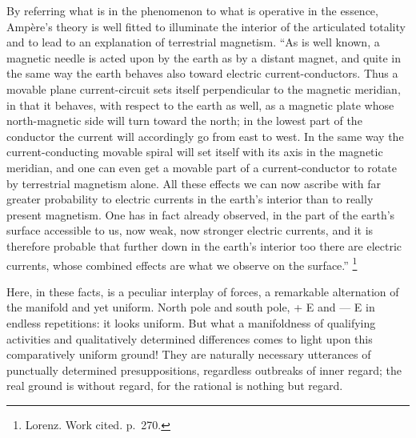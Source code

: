 \documentclass[12pt,a4paper]{book}
\begin{document}
By referring what is in the phenomenon to what is operative in the essence, Ampère's theory is well fitted to illuminate
the interior of the articulated totality and to lead to an explanation of terrestrial magnetism. ``As is well known, a
magnetic needle is acted upon by the earth
as by a distant magnet, and quite in the same way the earth behaves also toward electric current-conductors. Thus a
movable plane current-circuit sets itself perpendicular to the magnetic meridian, in that it behaves, with respect to the
earth as well, as a magnetic plate whose north-magnetic side will turn toward the north; in the lowest part of the
conductor the current will accordingly go from east to west. In the same way the current-conducting movable spiral will
set itself with its axis in the magnetic meridian, and one can even get a movable part of a current-conductor to rotate
by terrestrial magnetism alone. All these effects we can now ascribe with far greater probability to electric currents in
the earth's interior than to really present magnetism. One has in fact already observed, in the part of the earth's
surface accessible to us, now weak, now stronger electric currents, and it is therefore probable that further down in the
earth's interior too there are electric currents, whose combined effects are what we observe on the
surface.'' %
\footnote{%
Lorenz. Work cited. p.\ 270.}

Here, in these facts, is a peculiar interplay of forces, a remarkable alternation of the manifold and yet uniform. North
pole and south pole, + E and --- E in endless repetitions: it looks uniform. But what a manifoldness of qualifying
activities and qualitatively determined differences comes to light upon this comparatively uniform ground! They are
naturally necessary utterances of punctually determined presuppositions, regardless outbreaks of inner regard; the real
ground is without regard, for the rational is nothing but regard.
\end{document}
